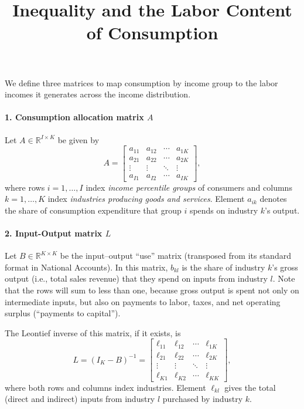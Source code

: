 \documentclass[12pt]{article}
\title{Inequality and the Labor Content of Consumption}
\author{}
\date{}
\begin{document}
\maketitle
\doublespacing


We define three matrices to map consumption by income group to the labor incomes it generates across the income distribution.

\paragraph{1. Consumption allocation matrix $A$}  
Let $A \in \mathbb{R}^{I \times K}$ be given by
\[
A =
\begin{bmatrix}
a_{11} & a_{12} & \cdots & a_{1K} \\
a_{21} & a_{22} & \cdots & a_{2K} \\
\vdots & \vdots & \ddots & \vdots \\
a_{I1} & a_{I2} & \cdots & a_{IK}
\end{bmatrix},
\]
where rows $i=1,\dots,I$ index \emph{income percentile groups} of consumers and columns $k=1,\dots,K$ index \emph{industries producing goods and services}.  
Element $a_{ik}$ denotes the share of consumption expenditure that group $i$ spends on industry $k$'s output.

\paragraph{2. Input-Output matrix $L$}  
Let $B \in \mathbb{R}^{K \times K}$ be the input–output ``use'' matrix (transposed from its standard format in National Accounts). In this matrix, $b_{kl}$ is the share of industry $k$'s gross output (i.e., total sales revenue) that they spend on inputs from industry $l$. Note that the rows will sum to less than one, because gross output is spent not only on intermediate inputs, but also on payments to labor, taxes, and net operating surplus (``payments to capital'').

The Leontief inverse of this matrix, if it exists, is
\[
L = (I_K - B)^{-1} =
\begin{bmatrix}
\ell_{11} & \ell_{12} & \cdots & \ell_{1K} \\
\ell_{21} & \ell_{22} & \cdots & \ell_{2K} \\
\vdots & \vdots & \ddots & \vdots \\
\ell_{K1} & \ell_{K2} & \cdots & \ell_{KK}
\end{bmatrix},
\]
where both rows and columns index industries.  
Element $\ell_{kl}$ gives the total (direct and indirect) inputs from industry $l$ purchased by industry $k$.
\end{document}
